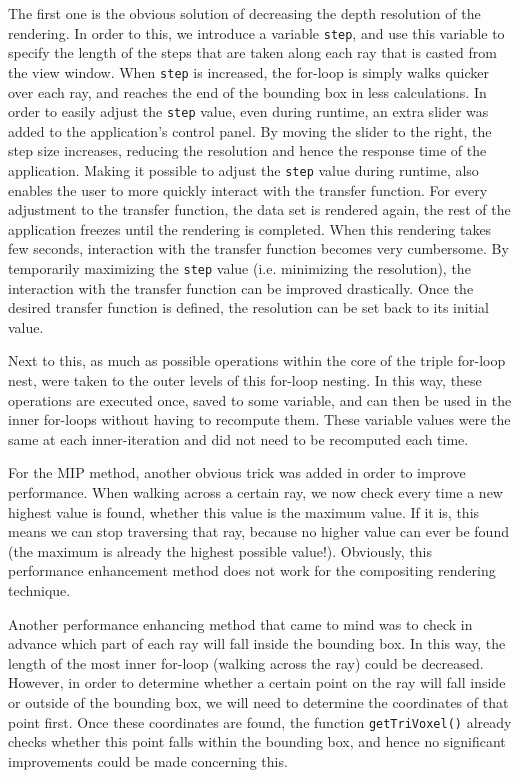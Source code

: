 The first one is the obvious solution of decreasing the depth resolution of the rendering. In order to this, we introduce a variable \texttt{step}, and use this variable to specify the length of the steps that are taken along each ray that is casted from the view window. When \texttt{step} is increased, the for-loop is simply walks quicker over each ray, and reaches the end of the bounding box in less calculations. In order to easily adjust the \texttt{step} value, even during runtime, an extra slider was added to the application's control panel. By moving the slider to the right, the step size increases, reducing the resolution and hence the response time of the application.
Making it possible to adjust the \texttt{step} value during runtime, also enables the user to more quickly interact with the transfer function. For every adjustment to the transfer function, the data set is rendered again, the rest of the application freezes until the rendering is completed. When this rendering takes few seconds, interaction with the transfer function becomes very cumbersome. By temporarily maximizing the \texttt{step} value (i.e. minimizing the resolution), the interaction with the transfer function can be improved drastically. Once the desired transfer function is defined, the resolution can be set back to its initial value.

Next to this, as much as possible operations within the core of the triple for-loop nest, were taken to the outer levels of this for-loop nesting. In this way, these operations are executed once, saved to some variable, and can then be used in the inner for-loops without having to recompute them.
These variable values were the same at each inner-iteration and did not need to be recomputed each time.

For the MIP method, another obvious trick was added in order to improve performance. When walking across a certain ray, we now check every time a new highest value is found, whether this value is the maximum value. If it is, this means we can stop traversing that ray, because no higher value can ever be found (the maximum is already the highest possible value!). Obviously, this performance enhancement method does not work for the compositing rendering technique.

\newpage

Another performance enhancing method that came to mind was to check in advance which part of each ray will fall inside the bounding box. In this way, the length of the most inner for-loop (walking across the ray) could be decreased. However, in order to determine whether a certain point on the ray will fall inside or outside of the bounding box, we will need to determine the coordinates of that point first. Once these coordinates are found, the function \texttt{getTriVoxel()} already checks whether this point falls within the bounding box, and hence no significant improvements could be made concerning this.

